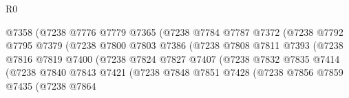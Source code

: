 \begin{lexlean}{R0}
\begin{coremodule}
                                      @7358
                                      (@7238
                                        @7776
                                        @7779
                                        @7365
                                        (@7238
                                          @7784
                                          @7787
                                          @7372
                                          (@7238
                                            @7792
                                            @7795
                                            @7379
                                            (@7238
                                              @7800
                                              @7803
                                              @7386
                                              (@7238
                                                @7808
                                                @7811
                                                @7393
                                                (@7238
                                                  @7816
                                                  @7819
                                                  @7400
                                                  (@7238
                                                    @7824
                                                    @7827
                                                    @7407
                                                    (@7238
                                                      @7832
                                                      @7835
                                                      @7414
                                                      (@7238
                                                        @7840
                                                        @7843
                                                        @7421
                                                        (@7238
                                                          @7848
                                                          @7851
                                                          @7428
                                                          (@7238
                                                            @7856
                                                            @7859
                                                            @7435
                                                            (@7238
                                                              @7864

\end{coremodule}
\end{lexlean}
